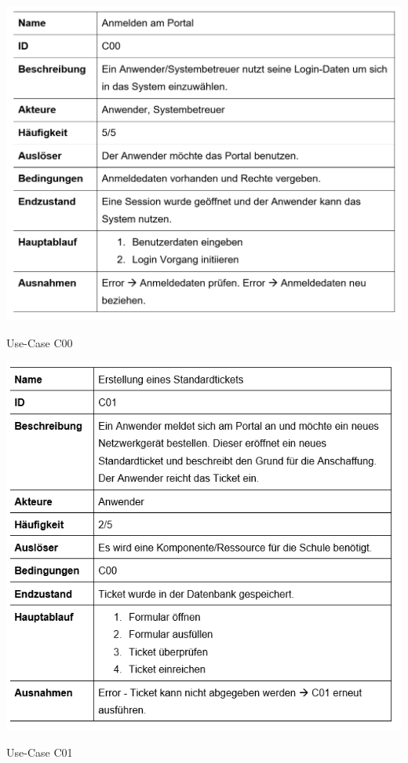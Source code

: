 
\vspace{-.5cm}
\begin{table}[h]
	\centering
	\includegraphics[scale=0.51]{figures/C00.png}
	\caption{Use-Case C00}
	\label{Abb_C00}
\end{table}
\newpage
\vspace{-.5cm}	
\begin{table}[h]
	\centering
	\includegraphics[scale=0.55]{figures/C01.png}
	\caption{Use-Case C01}
	\label{Abb_C01}
\end{table}
